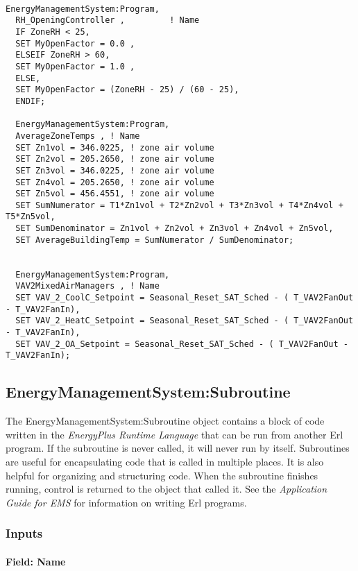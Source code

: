 \begin{lstlisting}

EnergyManagementSystem:Program,
  RH_OpeningController ,         ! Name
  IF ZoneRH < 25,
  SET MyOpenFactor = 0.0 ,
  ELSEIF ZoneRH > 60,
  SET MyOpenFactor = 1.0 ,
  ELSE,
  SET MyOpenFactor = (ZoneRH - 25) / (60 - 25),
  ENDIF;

  EnergyManagementSystem:Program,
  AverageZoneTemps , ! Name
  SET Zn1vol = 346.0225, ! zone air volume
  SET Zn2vol = 205.2650, ! zone air volume
  SET Zn3vol = 346.0225, ! zone air volume
  SET Zn4vol = 205.2650, ! zone air volume
  SET Zn5vol = 456.4551, ! zone air volume
  SET SumNumerator = T1*Zn1vol + T2*Zn2vol + T3*Zn3vol + T4*Zn4vol + T5*Zn5vol,
  SET SumDenominator = Zn1vol + Zn2vol + Zn3vol + Zn4vol + Zn5vol,
  SET AverageBuildingTemp = SumNumerator / SumDenominator;


  EnergyManagementSystem:Program,
  VAV2MixedAirManagers , ! Name
  SET VAV_2_CoolC_Setpoint = Seasonal_Reset_SAT_Sched - ( T_VAV2FanOut - T_VAV2FanIn),
  SET VAV_2_HeatC_Setpoint = Seasonal_Reset_SAT_Sched - ( T_VAV2FanOut - T_VAV2FanIn),
  SET VAV_2_OA_Setpoint = Seasonal_Reset_SAT_Sched - ( T_VAV2FanOut - T_VAV2FanIn);
\end{lstlisting}

\subsection{EnergyManagementSystem:Subroutine}\label{energymanagementsystemsubroutine}

The EnergyManagementSystem:Subroutine object contains a block of code written in the \emph{EnergyPlus Runtime Language} that can be run from another Erl program. If the subroutine is never called, it will never run by itself. Subroutines are useful for encapsulating code that is called in multiple places. It is also helpful for organizing and structuring code. When the subroutine finishes running, control is returned to the object that called it. See the \emph{Application Guide for EMS} for information on writing Erl programs.

\subsubsection{Inputs}\label{inputs-4-010}

\paragraph{Field: Name}\label{field-name-4-009}

